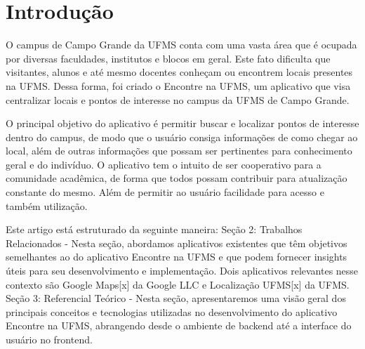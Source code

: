 \section{Introdução}
O campus de Campo Grande da UFMS conta com uma vasta área que é ocupada por diversas faculdades, institutos e blocos em geral. Este fato dificulta que visitantes, alunos e até mesmo docentes conheçam ou encontrem locais presentes na UFMS. Dessa forma, foi criado o Encontre na UFMS, um aplicativo que visa centralizar locais e pontos de interesse no campus da UFMS de Campo Grande.

O principal objetivo do aplicativo é permitir buscar e localizar pontos de interesse dentro do campus, de modo que o usuário consiga informações de como chegar ao local, além de outras informações que possam ser pertinentes para conhecimento geral e do indivíduo. O aplicativo tem o intuito de ser cooperativo para a comunidade acadêmica, de forma que todos possam contribuir para atualização constante do mesmo. Além de permitir ao usuário facilidade para acesso e também utilização.

Este artigo está estruturado da seguinte maneira: Seção 2: Trabalhos Relacionados - Nesta seção, abordamos aplicativos existentes que têm objetivos semelhantes ao do aplicativo Encontre na UFMS e que podem fornecer insights úteis para seu desenvolvimento e implementação. Dois aplicativos relevantes nesse contexto são Google Maps[x] da Google LLC e Localização UFMS[x] da UFMS. Seção 3: Referencial Teórico - Nesta seção, apresentaremos uma visão geral dos principais conceitos e tecnologias utilizadas no desenvolvimento do aplicativo Encontre na UFMS, abrangendo desde o ambiente de backend até a interface do usuário no frontend.